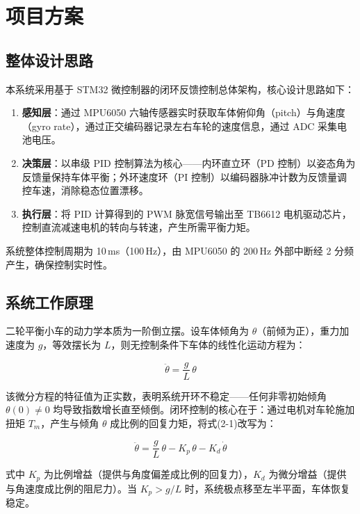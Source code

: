 \documentclass[12pt,a4paper,UTF8]{ctexrep}
\begin{document}
\chapter{项目方案}

\section{整体设计思路}

本系统采用基于 STM32 微控制器的闭环反馈控制总体架构，核心设计思路如下：

\begin{enumerate}
  \item \textbf{感知层}：通过 MPU6050 六轴传感器实时获取车体俯仰角（pitch）与角速度（gyro rate），通过正交编码器记录左右车轮的速度信息，通过 ADC 采集电池电压。
  \item \textbf{决策层}：以串级 PID 控制算法为核心——内环直立环（PD 控制）以姿态角为反馈量保持车体平衡；外环速度环（PI 控制）以编码器脉冲计数为反馈量调控车速，消除稳态位置漂移。
  \item \textbf{执行层}：将 PID 计算得到的 PWM 脉宽信号输出至 TB6612 电机驱动芯片，控制直流减速电机的转向与转速，产生所需平衡力矩。
\end{enumerate}

系统整体控制周期为 10\,ms（100\,Hz），由 MPU6050 的 200\,Hz 外部中断经 2 分频产生，确保控制实时性。

\section{系统工作原理}

二轮平衡小车的动力学本质为一阶倒立摆。设车体倾角为 $\theta$（前倾为正），重力加速度为 $g$，等效摆长为 $L$，则无控制条件下车体的线性化运动方程为：

\begin{equation}
  \ddot{\theta} = \frac{g}{L}\,\theta
\end{equation}

该微分方程的特征值为正实数，表明系统开环不稳定——任何非零初始倾角 $\theta(0) \neq 0$ 均导致指数增长直至倾倒。闭环控制的核心在于：通过电机对车轮施加扭矩 $T_m$，产生与倾角 $\theta$ 成比例的回复力矩，将式(2-1)改写为：

\begin{equation}
  \ddot{\theta} = \frac{g}{L}\,\theta - K_p\,\theta - K_d\,\dot{\theta}
\end{equation}

式中 $K_p$ 为比例增益（提供与角度偏差成比例的回复力），$K_d$ 为微分增益（提供与角速度成比例的阻尼力）。当 $K_p > g/L$ 时，系统极点移至左半平面，车体恢复稳定。
\end{document}
